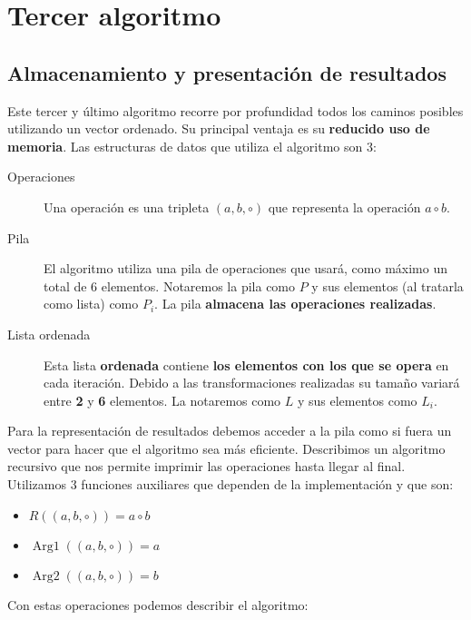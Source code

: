 \section{Tercer algoritmo}

\subsection{Almacenamiento y presentación de resultados}

Este tercer y último algoritmo recorre por profundidad todos los caminos
posibles utilizando un vector ordenado. Su principal ventaja es su \textbf{reducido
uso de memoria}. Las estructuras de datos que utiliza el algoritmo son 3:

\begin{description}
	\item[Operaciones] Una operación es una tripleta $(a,b,\circ)$ que representa
	la operación $a \circ b$.
	\item[Pila] El algoritmo utiliza una pila de operaciones que usará, como
	máximo un total de 6 elementos. Notaremos la pila como $P$ y sus elementos (al tratarla como
	lista) como $P_i$. La pila \textbf{almacena las operaciones realizadas}.
	\item[Lista ordenada] Esta lista \textbf{ordenada} contiene
	\textbf{los elementos con los que	se opera} en cada iteración.
	Debido a las transformaciones realizadas su tamaño variará entre \textbf{2} y
	\textbf{6} elementos. La notaremos como $L$ y sus elementos como $L_i$.
\end{description}


Para la representación de resultados debemos acceder a la pila como si
fuera un vector para hacer que el algoritmo sea más eficiente.
Describimos un algoritmo recursivo que nos permite imprimir las operaciones
hasta llegar al final. Utilizamos 3 funciones auxiliares que dependen
de la implementación y que son:

\begin{itemize}
	\item $R((a,b,\circ)) = a \circ b$
	\item $\operatorname{Arg1}((a,b,\circ)) = a$
	\item $\operatorname{Arg2}((a,b,\circ)) = b$
\end{itemize}

Con estas operaciones podemos describir el algoritmo:

